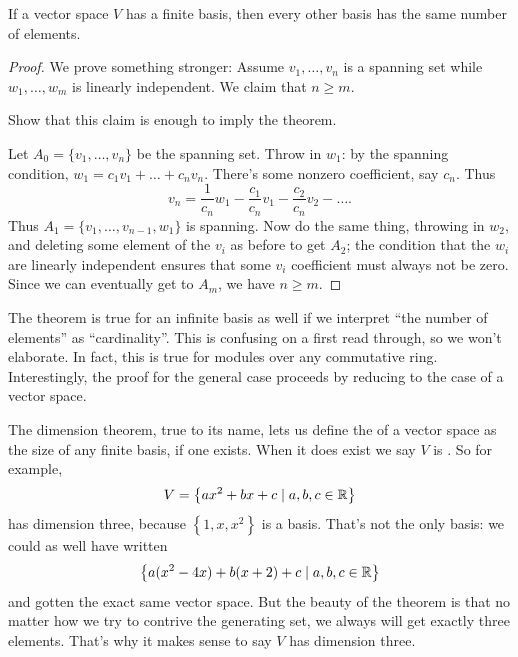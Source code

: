 \begin{theorem}
	\label{thm:dimension_theorem}
	If a vector space $V$ has a finite basis,
	then every other basis has the same number of elements.
\end{theorem}
\begin{proof}
	We prove something stronger:
	Assume $v_1, \dots, v_n$ is a spanning set
	while $w_1, \dots, w_m$ is linearly independent. We claim that $n \ge m$.
	\begin{ques}
		Show that this claim is enough to imply the theorem.
	\end{ques}

	Let $A_0 = \{v_1, \dots, v_n\}$ be the spanning set.
	Throw in $w_1$: by the spanning condition,
	$w_1 = c_1 v_1 + \dots + c_n v_n$.
	There's some nonzero coefficient, say $c_n$.
	Thus \[ v_n = \frac{1}{c_n} w_1 - \frac{c_1}{c_n}v_1 - \frac{c_2}{c_n}v_2 - \dots. \]
	Thus $A_1 = \{v_1, \dots, v_{n-1}, w_1\}$ is spanning.
	Now do the same thing, throwing in $w_2$,
	and deleting some element of the $v_i$ as before to get $A_2$;
	the condition that the $w_i$ are linearly independent
	ensures that some $v_i$ coefficient
	must always not be zero.
	Since we can eventually get to $A_m$, we have $n \ge m$.
\end{proof}
\begin{remark*}
	[Generalizations]
	\hfill
	\begin{itemize}
		\ii The theorem is true for an infinite basis as well
		if we interpret ``the number of elements'' as ``cardinality''.
		This is confusing on a first read through, so we won't elaborate.
		\ii In fact, this is true for modules over any commutative ring.
		Interestingly, the proof for the general case proceeds by reducing
		to the case of a vector space.
	\end{itemize}
\end{remark*}

The dimension theorem, true to its name,
lets us define the  of
a vector space as the size of any finite basis, if one exists.
When it does exist we say $V$ is .
So for example,
\[ V = \left\{ ax^2 + bx + c \mid a,b,c \in \mathbb R \right\} \]
has dimension three, because $\left\{ 1,x,x^2 \right\}$ is a basis.
That's not the only basis: we could as well have written
\[ \left\{ a(x^2-4x) + b(x+2) + c \mid a,b,c \in \mathbb R \right\} \]
and gotten the exact same vector space.
But the beauty of the theorem is that no matter how we try
to contrive the generating set, we always will get exactly three elements.
That's why it makes sense to say $V$ has dimension three.

